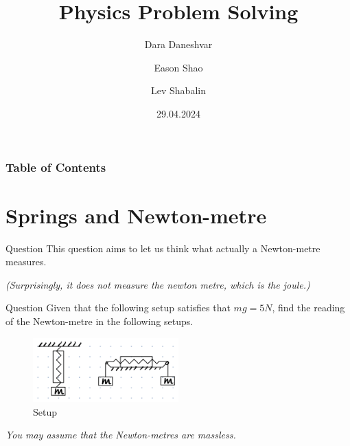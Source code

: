 \documentclass{beamer}
\title[Physics Problem Solving]{Physics Problem Solving}
\author{Dara Daneshvar \and Eason Shao \and Lev Shabalin}
\institute[]{Physics Problem Solving Society\\St Paul's School}
\date{29.04.2024}
\begin{document}
    \frame{\titlepage}
    
    \begin{frame}
        \frametitle{Table of Contents}
        \tableofcontents
    \end{frame}
    
    \section{Springs and Newton-metre}

    \begin{frame}{Question}
        This question aims to let us think what actually a Newton-metre measures.\pause

        \textit{(Surprisingly, it does not measure the newton metre, which is the joule.)}\pause

        \begin{block}{Question}
            Given that the following setup satisfies that $mg = 5 \si{N}$, find the reading of the Newton-metre in the following setups. \pause

            \begin{figure}
                \centering
                \includegraphics[width=0.5\textwidth]{diagram.jpg}
                \caption{Setup}
                \label{fig:SetupOfNewtonMetre}
            \end{figure}\pause

            \textit{You may assume that the Newton-metres are massless.}
        \end{block}
    \end{frame}
\end{document}

